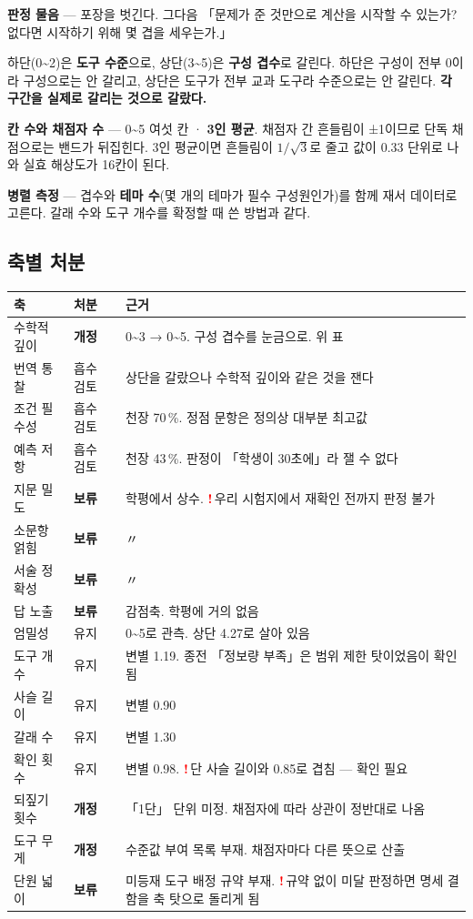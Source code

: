 \documentclass[11pt]{article}
\newcommand{\R}{\textcolor{red}{\textbf{!}}\,}
\begin{document}
\vspace{2mm}
\textbf{판정 물음} — 포장을 벗긴다. 그다음 「문제가 준 것만으로 계산을 시작할 수 있는가?
없다면 시작하기 위해 몇 겹을 세우는가.」

하단(0\textasciitilde2)은 \textbf{도구 수준}으로, 상단(3\textasciitilde5)은 \textbf{구성 겹수}로 갈린다.
하단은 구성이 전부 0이라 구성으로는 안 갈리고, 상단은 도구가 전부 교과 도구라 수준으로는 안 갈린다.
\textbf{각 구간을 실제로 갈리는 것으로 갈랐다.}

\textbf{칸 수와 채점자 수} — 0\textasciitilde5 여섯 칸 · \textbf{3인 평균}.
채점자 간 흔들림이 ±1이므로 단독 채점으로는 밴드가 뒤집힌다.
3인 평균이면 흔들림이 $1/\sqrt{3}$로 줄고 값이 0.33 단위로 나와 실효 해상도가 16칸이 된다.

\textbf{병렬 측정} — 겹수와 \textbf{테마 수}(몇 개의 테마가 필수 구성원인가)를 함께 재서
데이터로 고른다. 갈래 수와 도구 개수를 확정할 때 쓴 방법과 같다.

\subsection{축별 처분}

\begin{center}
\begin{longtable}{@{}p{30mm}p{20mm}p{78mm}@{}}
\toprule
\textbf{축} & \textbf{처분} & \textbf{근거} \\
\midrule
\endhead
수학적 깊이 & \textbf{개정} & 0\textasciitilde3 → 0\textasciitilde5. 구성 겹수를 눈금으로. 위 표 \\
번역 통찰 & 흡수 검토 & 상단을 갈랐으나 수학적 깊이와 같은 것을 잰다 \\
조건 필수성 & 흡수 검토 & 천장 70\,\%. 정점 문항은 정의상 대부분 최고값 \\
예측 저항 & 흡수 검토 & 천장 43\,\%. 판정이 「학생이 30초에」라 잴 수 없다 \\
\midrule
지문 밀도 & \textbf{보류} & 학평에서 상수. \R 우리 시험지에서 재확인 전까지 판정 불가 \\
소문항 얽힘 & \textbf{보류} & 〃 \\
서술 정확성 & \textbf{보류} & 〃 \\
답 노출 & \textbf{보류} & 감점축. 학평에 거의 없음 \\
엄밀성 & 유지 & 0\textasciitilde5로 관측. 상단 4.27로 살아 있음 \\
\midrule
도구 개수 & 유지 & 변별 1.19. 종전 「정보량 부족」은 범위 제한 탓이었음이 확인됨 \\
사슬 길이 & 유지 & 변별 0.90 \\
갈래 수 & 유지 & 변별 1.30 \\
확인 횟수 & 유지 & 변별 0.98. \R 단 사슬 길이와 0.85로 겹침 — 확인 필요 \\
되짚기 횟수 & \textbf{개정} & 「1단」 단위 미정. 채점자에 따라 상관이 정반대로 나옴 \\
도구 무게 & \textbf{개정} & 수준값 부여 목록 부재. 채점자마다 다른 뜻으로 산출 \\
단원 넓이 & \textbf{보류} & 미등재 도구 배정 규약 부재. \R 규약 없이 미달 판정하면 명세 결함을 축 탓으로 돌리게 됨 \\
\bottomrule
\end{longtable}
\end{center}
\end{document}
